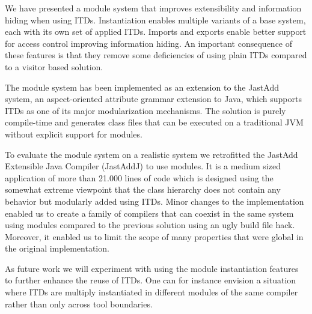 We have presented a module system that improves extensibility and
information hiding when using ITDs. Instantiation enables multiple
variants of a base system, each with its own set of applied ITDs. Imports
and exports enable better support for access control improving information
hiding. An important consequence of these features is that they remove some
deficiencies of using plain ITDs compared to a visitor based solution.

The module system has been implemented as an extension to the JastAdd
system, an aspect-oriented attribute grammar extension to Java, which
supports ITDs as one of its major modularization mechanisms. The solution
is purely compile-time and generates class files that can be executed on
a traditional JVM without explicit support for modules.

To evaluate the module system on a realistic system we retrofitted the
JastAdd Extensible Java Compiler (JastAddJ) to use modules. It is a medium
sized application of more than 21.000 lines of code which is designed using
the somewhat extreme viewpoint that the class hierarchy does not contain
any behavior but modularly added using ITDs. Minor changes to the
implementation enabled us to create a family of compilers that can coexist
in the same system using modules compared to the previous solution using an
ugly build file hack. Moreover, it enabled us to limit the scope of many
properties that were global in the original implementation.

As future work we will experiment with using the module instantiation
features to further enhance the reuse of ITDs. One can for instance
envision a situation where ITDs are multiply instantiated in different
modules of the same compiler rather than only across tool boundaries.
